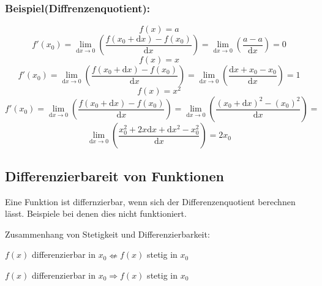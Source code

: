 \documentclass[11pt]{amsart}
\theoremstyle{remark}
\begin{document}
\subsubsection*{Beispiel(Diffrenzenquotient):}
\begin{equation}
	f(x) = a
\end{equation}
\begin{equation*}
	f'(x_0) = \lim_{\mathrm dx \to 0} \left( \frac {f(x_0 + \mathrm dx) - f(x_0)}{\mathrm dx} \right) = \lim_{\mathrm dx \to 0} \left( \frac {a-a}{\mathrm dx} \right)= 0
\end{equation*}
\begin{equation}
	f(x) = x
\end{equation}
\begin{equation*}
	f'(x_0) = \lim_{\mathrm dx \to 0} \left( \frac {f(x_0 + \mathrm dx) - f(x_0)}{\mathrm dx} \right) = \lim_{\mathrm dx \to 0} \left( \frac {\mathrm dx + x_0-x_0}{\mathrm dx} \right)= 1
\end{equation*}
\begin{equation}
	f(x) = x^2
\end{equation}
\begin{equation*}
	f'(x_0) = \lim_{\mathrm dx \to 0} \left( \frac {f(x_0 + \mathrm dx) - f(x_0)}{\mathrm dx} \right) =  
	\lim_{\mathrm dx \to 0} \left( \frac {(x_0 + \mathrm dx)^2 - (x_0)^2}{\mathrm dx} \right) =
	\end{equation*}
\begin{equation*}
	\lim_{\mathrm dx \to 0} \left( \frac { x_0^2 + 2x\mathrm dx + \mathrm dx^2 -x_0^2}{\mathrm dx} \right)= 
	2x_0
\end{equation*}

\subsection{Differenzierbareit von Funktionen}
Eine Funktion ist differnzierbar, wenn sich der Differenzenquotient berechnen l\"asst. Beispiele bei denen dies nicht funktioniert.\newline
\begin{figure}[h]
  \centering
 \end{figure}
Zusammenhang von Stetigkeit und Differenzierbarkeit:
\begin{center}
$f(x)$ differenzierbar in $x_0 \nLeftarrow f(x)$ stetig in $x_0$
\end{center}
\begin{center}
$f(x)$ differenzierbar in $x_0 \Rightarrow f(x)$ stetig in $x_0$	
\end{center}
\end{document}
